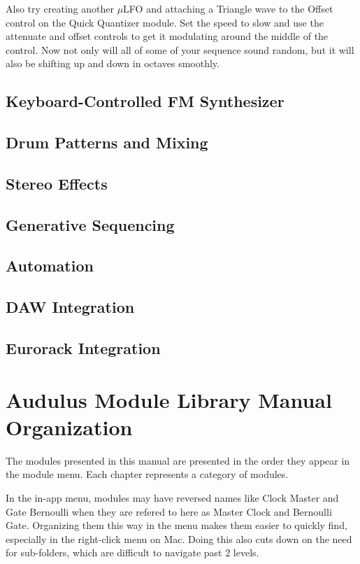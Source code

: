 \documentclass[11pt]{book}
\begin{document}
Also try creating another $\mu$LFO and attaching a Triangle wave to the Offset control on the Quick Quantizer module. Set the speed to slow and use the attenuate and offset controls to get it modulating around the middle of the control. Now not only will all of some of your sequence sound random, but it will also be shifting up and down in octaves smoothly.

\subsection{Keyboard-Controlled FM Synthesizer}



\subsection{Drum Patterns and Mixing}

\subsection{Stereo Effects}

\subsection{Generative Sequencing}

\subsection{Automation}

\subsection{DAW Integration}

\subsection{Eurorack Integration}

\section{Audulus Module Library Manual Organization}

The modules presented in this manual are presented in the order they appear in the module menu. Each chapter represents a category of modules.

In the in-app menu, modules may have reversed names like Clock Master and Gate Bernoulli when they are refered to here as Master Clock and Bernoulli Gate. Organizing them this way in the menu makes them easier to quickly find, especially in the right-click menu on Mac. Doing this also cuts down on the need for sub-folders, which are difficult to navigate past 2 levels.
\end{document}
